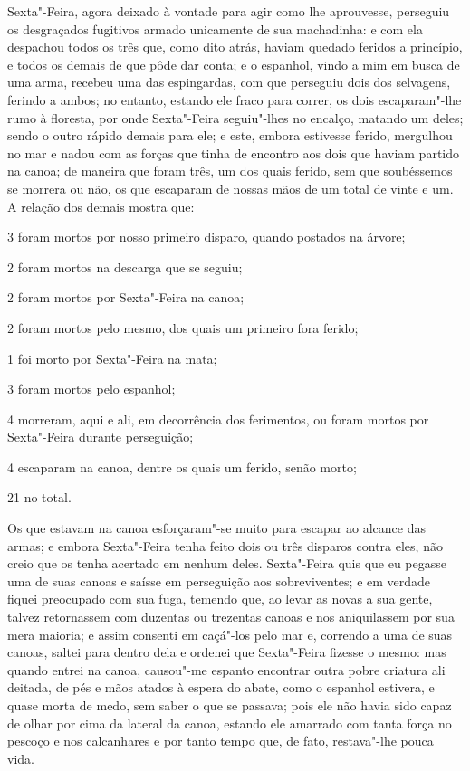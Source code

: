 Sexta"-Feira, agora deixado à vontade para agir como lhe aprouvesse,
perseguiu os desgraçados fugitivos armado unicamente de sua machadinha:
e com ela despachou todos os três que, como dito atrás, haviam quedado
feridos a princípio, e todos os demais de que pôde dar conta; e o
espanhol, vindo a mim em busca de uma arma, recebeu uma das espingardas,
com que perseguiu dois dos selvagens, ferindo a ambos; no entanto,
estando ele fraco para correr, os dois escaparam"-lhe rumo à floresta,
por onde Sexta"-Feira seguiu"-lhes no encalço, matando um deles; sendo o
outro rápido demais para ele; e este, embora estivesse ferido, mergulhou
no mar e nadou com as forças que tinha de encontro aos dois que haviam
partido na canoa; de maneira que foram três, um dos quais ferido, sem
que soubéssemos se morrera ou não, os que escaparam de nossas mãos de um
total de vinte e um. A relação dos demais mostra que:

3 foram mortos por nosso primeiro disparo, quando postados na árvore;

2 foram mortos na descarga que se seguiu;

2 foram mortos por Sexta"-Feira na canoa;

2 foram mortos pelo mesmo, dos quais um primeiro fora ferido;

1 foi morto por Sexta"-Feira na mata;

3 foram mortos pelo espanhol;

4 morreram, aqui e ali, em decorrência dos ferimentos, ou foram mortos
por Sexta"-Feira durante perseguição;

4 escaparam na canoa, dentre os quais um ferido, senão morto;

21 no total.

Os que estavam na canoa esforçaram"-se muito para escapar ao alcance das
armas; e embora Sexta"-Feira tenha feito dois ou três disparos contra
eles, não creio que os tenha acertado em nenhum deles. Sexta"-Feira quis
que eu pegasse uma de suas canoas e saísse em perseguição aos
sobreviventes; e em verdade fiquei preocupado com sua fuga, temendo que,
ao levar as novas a sua gente, talvez retornassem com duzentas ou
trezentas canoas e nos aniquilassem por sua mera maioria; e assim
consenti em caçá"-los pelo mar e, correndo a uma de suas canoas, saltei
para dentro dela e ordenei que Sexta"-Feira fizesse o mesmo: mas quando
entrei na canoa, causou"-me espanto encontrar outra pobre criatura ali
deitada, de pés e mãos atados à espera do abate, como o espanhol
estivera, e quase morta de medo, sem saber o que se passava; pois ele
não havia sido capaz de olhar por cima da lateral da canoa, estando ele
amarrado com tanta força no pescoço e nos calcanhares e por tanto tempo
que, de fato, restava"-lhe pouca vida.

